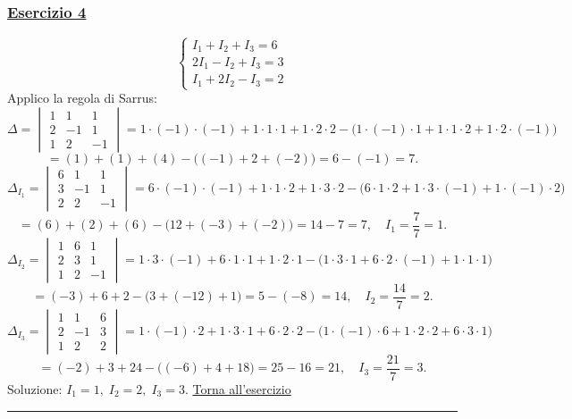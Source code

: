 \subsubsection*{\hyperref[ex:4]{Esercizio 4}}
\[
\begin{cases}
I_1 + I_2 + I_3 = 6 \\
2I_1 - I_2 + I_3 = 3 \\
I_1 + 2I_2 - I_3 = 2
\end{cases}
\]
Applico la regola di Sarrus:
\[
\Delta = \begin{vmatrix}
1 & 1 & 1 \\
2 & -1 & 1 \\
1 & 2 & -1
\end{vmatrix}
= 1\cdot(-1)\cdot(-1) + 1\cdot1\cdot1 + 1\cdot2\cdot2
      - \bigl(1\cdot(-1)\cdot1 + 1\cdot1\cdot2 + 1\cdot2\cdot(-1)\bigr)
\]
\[
= (1) + (1) + (4) - \bigl((-1) + 2 + (-2)\bigr) = 6 - (-1) = 7.
\]
\[
\Delta_{I_1} = \begin{vmatrix}
6 & 1 & 1 \\
3 & -1 & 1 \\
2 & 2 & -1
\end{vmatrix}
= 6\cdot(-1)\cdot(-1) + 1\cdot1\cdot2 + 1\cdot3\cdot2
      - \bigl(6\cdot1\cdot2 + 1\cdot3\cdot(-1) + 1\cdot(-1)\cdot2\bigr)
\]
\[
= (6) + (2) + (6) - \bigl(12 + (-3) + (-2)\bigr) = 14 - 7 = 7,\quad I_1 = \frac{7}{7}=1.
\]
\[
\Delta_{I_2} = \begin{vmatrix}
1 & 6 & 1 \\
2 & 3 & 1 \\
1 & 2 & -1
\end{vmatrix}
= 1\cdot3\cdot(-1) + 6\cdot1\cdot1 + 1\cdot2\cdot1
      - \bigl(1\cdot3\cdot1 + 6\cdot2\cdot(-1) + 1\cdot1\cdot1\bigr)
\]
\[
= (-3) + 6 + 2 - \bigl(3 + (-12) + 1\bigr) = 5 - (-8) = 14,\quad I_2 = \frac{14}{7}=2.
\]
\[
\Delta_{I_3} = \begin{vmatrix}
1 & 1 & 6 \\
2 & -1 & 3 \\
1 & 2 & 2
\end{vmatrix}
= 1\cdot(-1)\cdot2 + 1\cdot3\cdot1 + 6\cdot2\cdot2
      - \bigl(1\cdot(-1)\cdot6 + 1\cdot2\cdot2 + 6\cdot3\cdot1\bigr)
\]
\[
= (-2) + 3 + 24 - \bigl((-6) + 4 + 18\bigr) = 25 - 16 = 21,\quad I_3 = \frac{21}{7}=3.
\]
Soluzione: \(I_1=1,\; I_2=2,\; I_3=3\). \hfill \hyperlink{ex:4}{Torna all'esercizio}\\
\hrule

